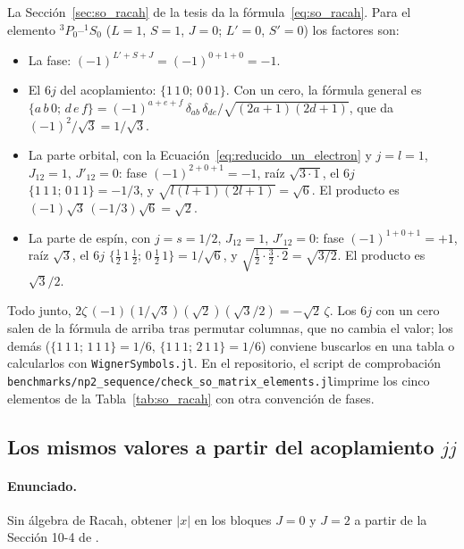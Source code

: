 \documentclass[11pt,a4paper]{article}
\begin{document}
La Sección~\ref{sec:so_racah} de la tesis da la fórmula~\eqref{eq:so_racah}. Para el elemento
$^3P_0$--$^1S_0$ ($L=1$, $S=1$, $J=0$; $L'=0$, $S'=0$) los factores son:
\begin{itemize}
\item La fase: $(-1)^{L'+S+J} = (-1)^{0+1+0} = -1$.
\item El $6j$ del acoplamiento: $\{1\,1\,0;\,0\,0\,1\}$. Con un cero, la fórmula general es
$\{a\,b\,0;\,d\,e\,f\} = (-1)^{a+e+f}\,\delta_{ab}\,\delta_{de}/\sqrt{(2a+1)(2d+1)}$, que da
$(-1)^{2}/\sqrt{3} = 1/\sqrt{3}$.
\item La parte orbital, con la Ecuación~\eqref{eq:reducido_un_electron} y $j=l=1$, $J_{12}=1$, $J'_{12}=0$:
fase $(-1)^{2+0+1} = -1$, raíz $\sqrt{3\cdot1}$, el $6j$ $\{1\,1\,1;\,0\,1\,1\} = -1/3$, y
$\sqrt{l(l+1)(2l+1)} = \sqrt{6}$. El producto es $(-1)\sqrt{3}\,(-1/3)\sqrt{6} = \sqrt{2}$.
\item La parte de espín, con $j=s=1/2$, $J_{12}=1$, $J'_{12}=0$: fase $(-1)^{1+0+1} = +1$, raíz
$\sqrt{3}$, el $6j$ $\{\tfrac12\,1\,\tfrac12;\,0\,\tfrac12\,1\} = 1/\sqrt{6}$, y $\sqrt{\tfrac12\cdot\tfrac32\cdot2} = \sqrt{3/2}$.
El producto es $\sqrt{3}/2$.
\end{itemize}
Todo junto, $2\zeta\,(-1)(1/\sqrt{3})(\sqrt{2})(\sqrt{3}/2) = -\sqrt{2}\,\zeta$. Los $6j$ con un cero
salen de la fórmula de arriba tras permutar columnas, que no cambia el valor; los demás
($\{1\,1\,1;\,1\,1\,1\} = 1/6$, $\{1\,1\,1;\,2\,1\,1\} = 1/6$) conviene buscarlos en una tabla o
calcularlos con \texttt{WignerSymbols.jl}. En el repositorio, el script de comprobación
\texttt{benchmarks/np2\_sequence/check\_so\_matrix\_elements.jl}\linebreak imprime los cinco
elementos de la Tabla~\ref{tab:so_racah} con otra convención de fases.

\subsection{Los mismos valores a partir del acoplamiento \texorpdfstring{$jj$}{jj}}

\paragraph{Enunciado.} Sin álgebra de Racah, obtener $|x|$ en los bloques $J=0$ y $J=2$ a partir
de la Sección 10-4 de \textcite{Cowan1981}.
\end{document}
